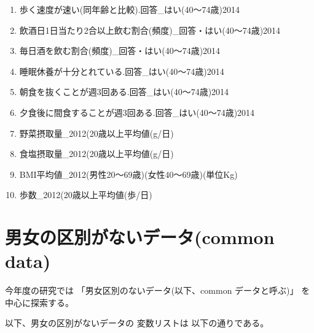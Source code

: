 \begin{multicols}{2}
\begin{enumerate}
  \item 歩く速度が速い(同年齢と比較).回答\_はい(40〜74歳)2014
  \item 飲酒日1日当たり2合以上飲む割合(頻度)\_回答・はい(40〜74歳)2014
  \item 毎日酒を飲む割合(頻度)\_回答・はい(40〜74歳)2014
  \item 睡眠休養が十分とれている.回答\_はい(40〜74歳)2014
  \item 朝食を抜くことが週3回ある.回答\_はい(40〜74歳)2014
  \item 夕食後に間食することが週3回ある.回答\_はい(40〜74歳)2014
  \item 野菜摂取量\_2012(20歳以上平均値(g/日)
  \item 食塩摂取量\_2012(20歳以上平均値(g/日)
  \item BMI平均値\_2012(男性20〜69歳)(女性40〜69歳)(単位Kg)
  \item 歩数\_2012(20歳以上平均値(歩/日)
\end{enumerate}


\end{multicols}




\newpage

\section{男女の区別がないデータ(common data)}



{今年度の研究では
「男女区別のないデータ(以下、common データと呼ぶ)」
を中心に探索する。
}


以下、男女の区別がないデータの
変数リストは
以下の通りである。

%
%
%
%
%







